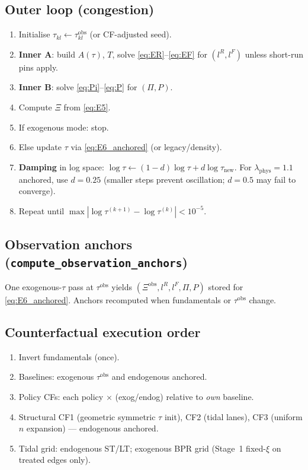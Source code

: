 \documentclass[12pt]{article}
\newcommand{\obs}{\mathrm{obs}}
\begin{document}
\subsection{Outer loop (congestion)}

\begin{enumerate}[leftmargin=2em]
  \item Initialise $\tau_{kl}\leftarrow\tau^{\obs}_{kl}$ (or CF-adjusted seed).
  \item \textbf{Inner A}: build $A(\tau)$, $T$, solve \eqref{eq:ER}--\eqref{eq:EF}
        for $(l^R,l^F)$ unless short-run pins apply.
  \item \textbf{Inner B}: solve \eqref{eq:Pi}--\eqref{eq:P} for $(\Pi,P)$.
  \item Compute $\Xi$ from \eqref{eq:E5}.
  \item If exogenous mode: stop.
  \item Else update $\tau$ via \eqref{eq:E6_anchored} (or legacy/density).
  \item \textbf{Damping} in log space:
        $\log\tau \leftarrow (1-d)\log\tau + d\log\tau_{\mathrm{new}}$.
        For $\lambda_{\mathrm{phys}}=1.1$ anchored, use $d=0.25$ (smaller steps
        prevent oscillation; $d=0.5$ may fail to converge).
  \item Repeat until $\max|\log\tau^{(k+1)}-\log\tau^{(k)}|<10^{-5}$.
\end{enumerate}

\subsection{Observation anchors (\texttt{compute\_observation\_anchors})}

One exogenous-$\tau$ pass at $\tau^{\obs}$ yields $(\Xi^{\obs},l^R,l^F,\Pi,P)$
stored for \eqref{eq:E6_anchored}.
Anchors recomputed when fundamentals or $\tau^{\obs}$ change.

\subsection{Counterfactual execution order}

\begin{enumerate}[leftmargin=2em]
  \item Invert fundamentals (once).
  \item Baselines: exogenous $\tau^{\obs}$ and endogenous anchored.
  \item Policy CFs: each policy $\times$ (exog/endog) relative to \emph{own} baseline.
  \item Structural CF1 (geometric symmetric $\tau$ init), CF2 (tidal lanes),
        CF3 (uniform $n$ expansion) --- endogenous anchored.
  \item Tidal grid: endogenous ST/LT; exogenous BPR grid (Stage~1 fixed-$\xi$
        on treated edges only).
\end{enumerate}
\end{document}
